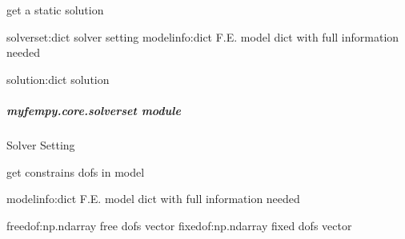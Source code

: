 \documentclass[letterpaper,10pt,english]{sphinxmanual}
\begin{document}
\begin{fulllineitems}

\begin{fulllineitems}
\label{\detokenize{myfempy.core:myfempy.core.solver.Solver.get_static_solve}}
\pysigstartsignatures
{}
\pysigstopsignatures
\sphinxAtStartPar
get a static solution
\begin{description}
\sphinxAtStartPar
solverset:dict  \textendash{} solver setting
modelinfo:dict  \textendash{} F.E. model dict with full information needed

\sphinxAtStartPar
solution:dict   \textendash{} solution

\end{description}

\end{fulllineitems}


\end{fulllineitems}



\subparagraph{myfempy.core.solverset module}
\label{\detokenize{myfempy.core:module-myfempy.core.solverset}}\label{\detokenize{myfempy.core:myfempy-core-solverset-module}}
\sphinxAtStartPar
Solver Setting

\begin{fulllineitems}
\label{\detokenize{myfempy.core:myfempy.core.solverset.get_constrains_dofs}}
\pysigstartsignatures
{}
\pysigstopsignatures
\sphinxAtStartPar
get constrains dofs in model
\begin{description}
\sphinxAtStartPar
modelinfo:dict      \textendash{} F.E. model dict with full information needed

\sphinxAtStartPar
freedof:np.ndarray  \textendash{} free dofs vector
fixedof:np.ndarray  \textendash{} fixed dofs vector

\end{description}

\end{fulllineitems}
\end{document}
